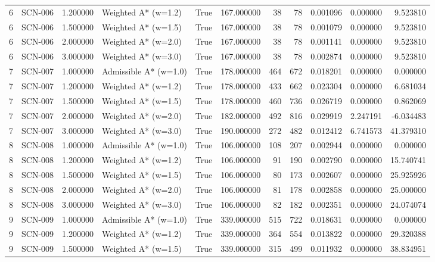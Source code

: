 \begin{table}[htbp]
\begin{tabular}{rlrlrrrrrrr}
6 & SCN-006 & 1.200000 & Weighted A* (w=1.2) & True & 167.000000 & 38 & 78 & 0.001096 & 0.000000 & 9.523810 \\
6 & SCN-006 & 1.500000 & Weighted A* (w=1.5) & True & 167.000000 & 38 & 78 & 0.001079 & 0.000000 & 9.523810 \\
6 & SCN-006 & 2.000000 & Weighted A* (w=2.0) & True & 167.000000 & 38 & 78 & 0.001141 & 0.000000 & 9.523810 \\
6 & SCN-006 & 3.000000 & Weighted A* (w=3.0) & True & 167.000000 & 38 & 78 & 0.002874 & 0.000000 & 9.523810 \\
7 & SCN-007 & 1.000000 & Admissible A* (w=1.0) & True & 178.000000 & 464 & 672 & 0.018201 & 0.000000 & 0.000000 \\
7 & SCN-007 & 1.200000 & Weighted A* (w=1.2) & True & 178.000000 & 433 & 662 & 0.023304 & 0.000000 & 6.681034 \\
7 & SCN-007 & 1.500000 & Weighted A* (w=1.5) & True & 178.000000 & 460 & 736 & 0.026719 & 0.000000 & 0.862069 \\
7 & SCN-007 & 2.000000 & Weighted A* (w=2.0) & True & 182.000000 & 492 & 816 & 0.029919 & 2.247191 & -6.034483 \\
7 & SCN-007 & 3.000000 & Weighted A* (w=3.0) & True & 190.000000 & 272 & 482 & 0.012412 & 6.741573 & 41.379310 \\
8 & SCN-008 & 1.000000 & Admissible A* (w=1.0) & True & 106.000000 & 108 & 207 & 0.002944 & 0.000000 & 0.000000 \\
8 & SCN-008 & 1.200000 & Weighted A* (w=1.2) & True & 106.000000 & 91 & 190 & 0.002790 & 0.000000 & 15.740741 \\
8 & SCN-008 & 1.500000 & Weighted A* (w=1.5) & True & 106.000000 & 80 & 173 & 0.002607 & 0.000000 & 25.925926 \\
8 & SCN-008 & 2.000000 & Weighted A* (w=2.0) & True & 106.000000 & 81 & 178 & 0.002858 & 0.000000 & 25.000000 \\
8 & SCN-008 & 3.000000 & Weighted A* (w=3.0) & True & 106.000000 & 82 & 182 & 0.002351 & 0.000000 & 24.074074 \\
9 & SCN-009 & 1.000000 & Admissible A* (w=1.0) & True & 339.000000 & 515 & 722 & 0.018631 & 0.000000 & 0.000000 \\
9 & SCN-009 & 1.200000 & Weighted A* (w=1.2) & True & 339.000000 & 364 & 554 & 0.013822 & 0.000000 & 29.320388 \\
9 & SCN-009 & 1.500000 & Weighted A* (w=1.5) & True & 339.000000 & 315 & 499 & 0.011932 & 0.000000 & 38.834951 \\

\end{tabular}
\end{table}
